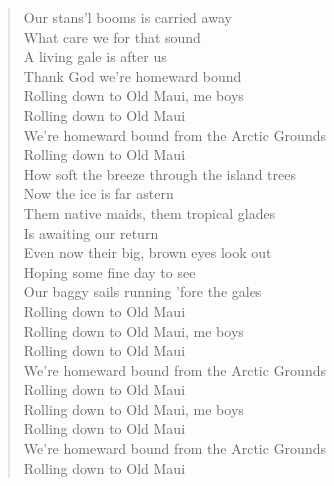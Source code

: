\documentclass[11pt]{article}
\begin{document}
\begin{verse}
Our stans'l booms is carried away\\
What care we for that sound\\
A living gale is after us\\
Thank God we're homeward bound\\
\vspace*{1em}
Rolling down to Old Maui, me boys\\
Rolling down to Old Maui\\
We're homeward bound from the Arctic Grounds\\
Rolling down to Old Maui\\
\vspace*{1em}
How soft the breeze through the island trees\\
Now the ice is far astern\\
Them native maids, them tropical glades\\
Is awaiting our return\\
Even now their big, brown eyes look out\\
Hoping some fine day to see\\
Our baggy sails running 'fore the gales\\
Rolling down to Old Maui\\
\vspace*{1em}
Rolling down to Old Maui, me boys\\
Rolling down to Old Maui\\
We're homeward bound from the Arctic Grounds\\
Rolling down to Old Maui\\
Rolling down to Old Maui, me boys\\
Rolling down to Old Maui\\
We're homeward bound from the Arctic Grounds\\
Rolling down to Old Maui\\
\end{verse}
\clearpage
\end{document}
